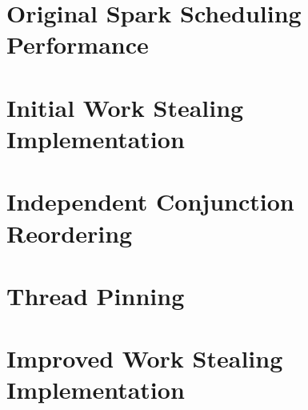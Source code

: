 \section{Original Spark Scheduling Performance}
\label{sec:original_scheduling_performance}



\section{Initial Work Stealing Implementation}
\label{sec:rts_work_stealing}



\section{Independent Conjunction Reordering}
\label{sec:rts_reorder}



\section{Thread Pinning}
\label{sec:rts_thread_pinning}



\section{Improved Work Stealing Implementation}
\label{sec:rts_work_stealing2}



%

